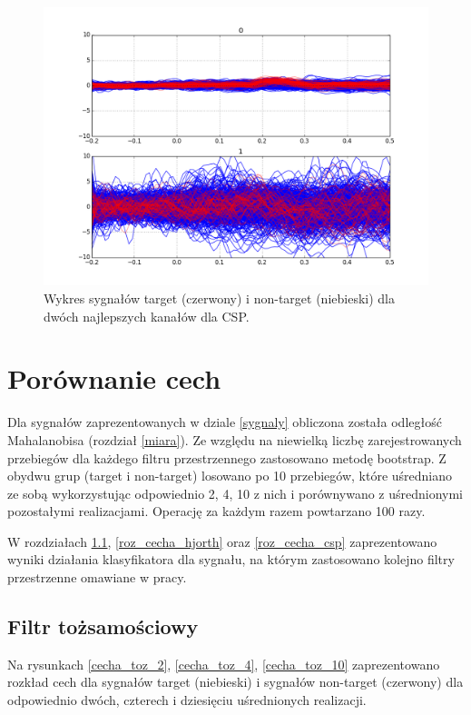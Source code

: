 \documentclass[licencjacka,openright]{pracamgr}
\begin{document}
\begin{figure}
\centering
\includegraphics[scale=0.55, trim=10mm 15mm 10mm 15mm, clip=True]{pics/sygnal_csp.png}
\caption{Wykres sygnałów target (czerwony) i non-target (niebieski) dla dwóch najlepszych kanałów dla CSP.}
\label{sygnal_csp}
\end{figure}

\section{Porównanie cech}
\label{porownanie_cech}
Dla sygnałów zaprezentowanych w dziale \ref{sygnaly} obliczona została odległość Mahalanobisa (rozdział \ref{miara}). Ze względu na niewielką liczbę zarejestrowanych przebiegów dla każdego filtru przestrzennego zastosowano metodę bootstrap. Z obydwu grup (target i non-target) losowano po 10 przebiegów, które uśredniano ze sobą wykorzystując odpowiednio 2, 4, 10 z nich i porównywano z uśrednionymi pozostałymi realizacjami. Operację za każdym razem powtarzano 100 razy.

W rozdziałach \ref{roz_cecha_toz}, \ref{roz_cecha_hjorth} oraz \ref{roz_cecha_csp} zaprezentowano wyniki działania klasyfikatora dla sygnału, na którym zastosowano kolejno filtry przestrzenne omawiane w pracy.

\subsection{Filtr tożsamościowy}
\label{roz_cecha_toz}
Na rysunkach \ref{cecha_toz_2}, \ref{cecha_toz_4}, \ref{cecha_toz_10} zaprezentowano rozkład cech dla sygnałów target (niebieski) i sygnałów non-target (czerwony) dla odpowiednio dwóch, czterech i dziesięciu uśrednionych realizacji.
\end{document}

